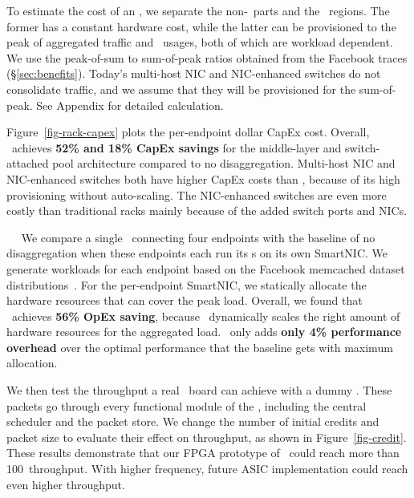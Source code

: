 To estimate the cost of an \snic, we separate the non-\nt\ parts and the \nt\ regions. The former has a constant hardware cost, while the latter can be provisioned to the peak of aggregated traffic and \nt\ usages, both of which are workload dependent. We use the peak-of-sum to sum-of-peak ratios obtained from the Facebook traces (\S\ref{sec:benefits}). Today's multi-host NIC and NIC-enhanced switches do not consolidate traffic, and we assume that they will be provisioned for the sum-of-peak. See Appendix for detailed calculation. 

Figure~\ref{fig-rack-capex} plots the per-endpoint dollar CapEx cost. Overall, \snic\ achieves \textbf{52\% and 18\% CapEx savings} for the middle-layer and switch-attached pool architecture compared to no disaggregation.
Multi-host NIC and NIC-enhanced switches both have higher CapEx costs than \snic, because of its high provisioning without auto-scaling. The NIC-enhanced switches are even more costly than traditional racks mainly because of the added switch ports and NICs.

~~
We compare a single \snic\ connecting four endpoints with the baseline of no disaggregation when these endpoints each run its \nt{}s on its own SmartNIC.
We generate workloads for each endpoint based on the Facebook memcached dataset distributions~\cite{Atikoglu12-SIGMETRICS}.
For the per-endpoint SmartNIC, we statically allocate the hardware resources that can cover the peak load.
Overall, we found that \snic\ achieves \textbf{56\% OpEx saving}, because \snic\ dynamically scales the right amount of hardware resources for the aggregated load.
\snic\ only adds \textbf{only 4\% performance overhead} over the optimal performance that the baseline gets with maximum allocation.

We then test the throughput a real \snic\ board can achieve with a dummy \nt.
These packets go through every functional module of the \snic, including the central scheduler and the packet store. 
We change the number of initial credits and packet size to evaluate their effect on throughput, as shown in Figure~\ref{fig-credit}.
These results demonstrate that our FPGA prototype of \snic\ could reach more than 100\Gbps\ throughput. 
With higher frequency, future ASIC implementation could reach even higher throughput.

